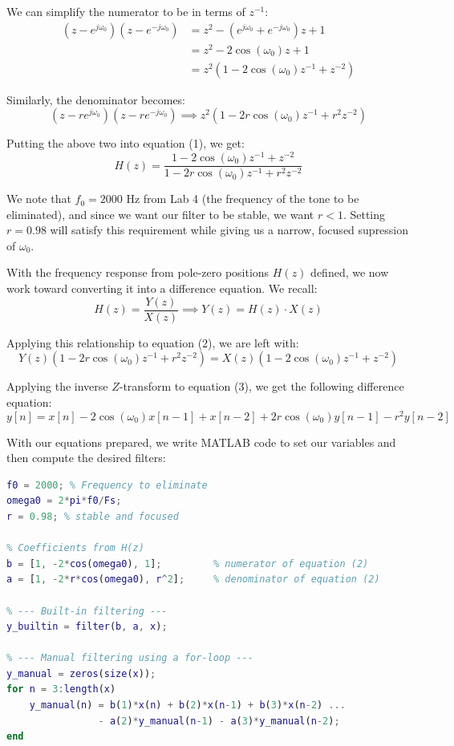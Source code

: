 \documentclass{article}
\begin{document}
We can simplify the numerator to be in terms of $z^{-1}$:
\begin{align*}
    \left(z - e^{j\omega_0}\right)\left(z - e^{-j\omega_0}\right)
    &= z^2 - \left(e^{j\omega_0} + e^{-j\omega_0}\right)z + 1 \\
    &= z^2 - 2\cos(\omega_0)z + 1 \\
    &= z^2 \left(1 - 2\cos(\omega_0)z^{-1} + z^{-2}\right)
\end{align*}

Similarly, the denominator becomes:
\[
(z-re^{j\omega_0})(z-re^{-j\omega_0}) \implies z^2 \left(1 - 2r\cos(\omega_0)z^{-1} + r^2z^{-2}\right)
\]

Putting the above two into equation (1), we get:
\begin{equation}
    H(z) = \frac{1 - 2\cos(\omega_0)z^{-1} + z^{-2}}
                {1 - 2r\cos(\omega_0)z^{-1} + r^2z^{-2}}
\end{equation}

We note that $f_0 = 2000 \text{ Hz}$ from Lab 4 (the frequency of the tone to be eliminated), and since we want our filter to be stable, we want $r < 1$. Setting $r = 0.98$ will satisfy this requirement while giving us a narrow, focused supression of $\omega_0$.

With the frequency response from pole-zero positions $H(z)$ defined, we now work toward converting it into a difference equation. We recall:
\[
H(z) = \frac{Y(z)}{X(z)} \implies Y(z) = H(z) \cdot X(z)
\]

Applying this relationship to equation (2), we are left with:
\begin{equation}
    Y(z)(1 - 2r\cos(\omega_0)z^{-1} + r^2z^{-2}) = X(z)(1 - 2\cos(\omega_0)z^{-1} + z^{-2})
\end{equation}

Applying the inverse $Z$-transform to equation (3), we get the following difference equation:
\begin{equation}
y[n] = x[n] - 2\cos(\omega_0)x[n-1] + x[n-2] + 2r\cos(\omega_0)y[n-1] - r^2 y[n-2]
\end{equation}

\newpage

With our equations prepared, we write MATLAB code to set our variables and then compute the desired filters:

\begin{lstlisting}[caption={MATLAB code to filter the audio signal.}, label={lst:audio_filtering}, language=Matlab]
% Target tone to remove
f0 = 2000; % Frequency to eliminate
omega0 = 2*pi*f0/Fs;
r = 0.98; % stable and focused        

% Coefficients from H(z)
b = [1, -2*cos(omega0), 1];         % numerator of equation (2)
a = [1, -2*r*cos(omega0), r^2];     % denominator of equation (2)

% --- Built-in filtering ---
y_builtin = filter(b, a, x);

% --- Manual filtering using a for-loop ---
y_manual = zeros(size(x));
for n = 3:length(x)
    y_manual(n) = b(1)*x(n) + b(2)*x(n-1) + b(3)*x(n-2) ...
                - a(2)*y_manual(n-1) - a(3)*y_manual(n-2);
end
\end{lstlisting}
\end{document}
